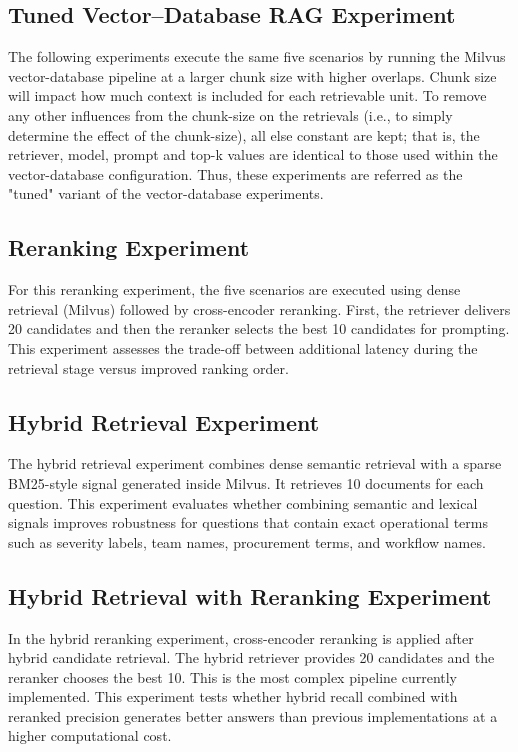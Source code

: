 \subsection{Tuned Vector--Database RAG Experiment}

The following experiments execute the same five scenarios by running the Milvus vector-database pipeline at a larger chunk size with higher overlaps. Chunk size will impact how much context is included for each retrievable unit. To remove any other influences from the chunk-size on the retrievals (i.e., to simply determine the effect of the chunk-size), all else constant are kept; that is, the retriever, model, prompt and top-k values are identical to those used within the vector-database configuration. Thus, these experiments are referred as the "tuned" variant of the vector-database experiments.

\subsection{Reranking Experiment}

For this reranking experiment, the five scenarios are executed using dense retrieval (Milvus) followed by cross-encoder reranking. First, the retriever delivers 20 candidates and then the reranker selects the best 10 candidates for prompting. This experiment assesses the trade-off between additional latency during the retrieval stage versus improved ranking order.

\subsection{Hybrid Retrieval Experiment}

The hybrid retrieval experiment combines dense semantic retrieval with a sparse BM25-style signal generated inside Milvus. It retrieves 10 documents for each question. This experiment evaluates whether combining semantic and lexical signals improves robustness for questions that contain exact operational terms such as severity labels, team names, procurement terms, and workflow names.

\subsection{Hybrid Retrieval with Reranking Experiment}

In the hybrid reranking experiment, cross-encoder reranking is applied after hybrid candidate retrieval. The hybrid retriever provides 20 candidates and the reranker chooses the best 10. This is the most complex pipeline currently implemented. This experiment tests whether hybrid recall combined with reranked precision generates better answers than previous implementations at a higher computational cost.

